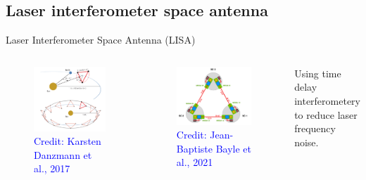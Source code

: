 \documentclass[pdf]{beamer}
\newcommand{\credit}[1]{\tiny{\textcolor{blue}{Credit: #1}}}
\begin{document}
\subsection{Laser interferometer space antenna}
\begin{frame}{Laser Interferometer Space Antenna (LISA)}
\begin{columns}

\begin{figure}
\includegraphics[scale=.15]{fig/LISA.png}
\caption*{\credit{Karsten Danzmann et al., 2017}}
\end{figure}

\begin{figure}
\includegraphics[scale=.12]{fig/LISAsch.png}
\caption*{\credit{Jean-Baptiste Bayle et al., 2021}}
\end{figure}
Using time delay interferometery to reduce laser frequency noise.

\end{columns}
\end{frame}
\end{document}

